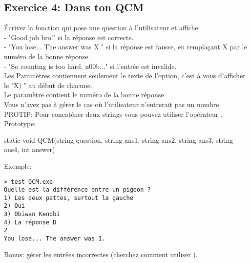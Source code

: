 \subsection{Exercice 4: Dans ton QCM}

Écrivez la fonction  qui pose une question à l'utilisateur et affiche:\\
- "Good job bro!" si la réponse est correcte.\\
- "You lose... The answer was X." si la réponse est fausse, en remplaçant X par
le numéro de la bonne réponse.\\
- "So counting is too hard, n00b..." si l'entrée est invalide.\\
Les Paramètres  contiennent seulement le texte de l'option, c'est à vous
d'afficher le "X) " au début de chacune.\\
Le paramètre  contient le numéro de la bonne réponse.\\
Vous n'avez pas à gérer le cas où l'utilisateur n'entrerait pas un nombre.\\
PROTIP: Pour concaténer deux strings vous pouvez utiliser l'opérateur \codeil{+}.\\

Prototype:
\begin{code}
static void QCM(string question,
                string ans1,
                string ans2,
                string ans3,
                string ans4,
                int answer)
\end{code}
\newpage
Exemple:
\begin{verbatim}
> test_QCM.exe
Quelle est la différence entre un pigeon ?
1) Les deux pattes, surtout la gauche
2) Oui
3) Obiwan Kenobi
4) La réponse D
2
You lose... The answer was 1.
\end{verbatim}

Bonus: gérer les entrées incorrectes (cherchez comment utiliser ).
